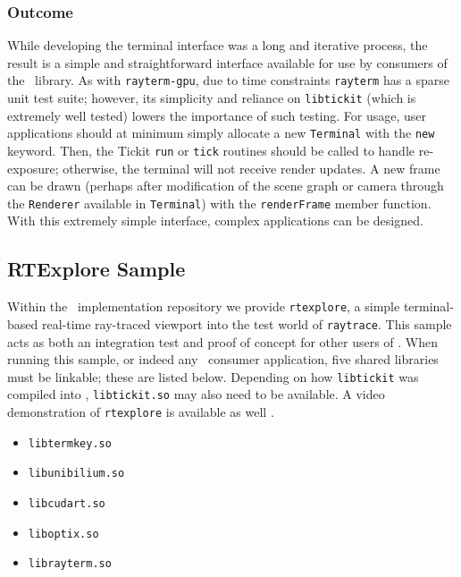 \subsubsection{Outcome} \label{ch:methods:interface:tickit:outcome}

While developing the terminal interface was a long and iterative process, the result is a simple and straightforward interface available for use by consumers of the \name\ library.
As with \texttt{rayterm-gpu}, due to time constraints \texttt{rayterm} has a sparse unit test suite; however, its simplicity and reliance on \texttt{libtickit} (which is extremely well tested) lowers the importance of such testing.
For usage, user applications should at minimum simply allocate a new \texttt{Terminal} with the \texttt{new} keyword.
Then, the Tickit \texttt{run} or \texttt{tick} routines should be called to handle re-exposure; otherwise, the terminal will not receive render updates.
A new frame can be drawn (perhaps after modification of the scene graph or camera through the \texttt{Renderer} available in \texttt{Terminal}) with the \texttt{renderFrame} member function.
With this extremely simple interface, complex applications can be designed.


\subsection{RTExplore Sample} \label{ch:methods:interface:sample}

Within the \name\ implementation repository \cite{raytermGpuImpl} we provide \texttt{rtexplore}, a simple terminal-based real-time ray-traced viewport into the test world of \texttt{raytrace}.
This sample acts as both an integration test and proof of concept for other users of \name.
When running this sample, or indeed any \name\ consumer application, five shared libraries must be linkable; these are listed below.
Depending on how \texttt{libtickit} was compiled into \name, \texttt{libtickit.so} may also need to be available.
A video demonstration of \texttt{rtexplore} is available as well \cite{raytermDemo}.

\vspace{-0.5em}
\begin{itemize}
  \vspace{-0.5em}
  \item \texttt{libtermkey.so}
  \vspace{-0.5em}
  \item \texttt{libunibilium.so}
  \vspace{-0.5em}
  \item \texttt{libcudart.so}
  \vspace{-0.5em}
  \item \texttt{liboptix.so}
  \vspace{-0.5em}
  \item \texttt{librayterm.so}
  \vspace{-0.5em}
\end{itemize}
\vspace{-0.5em}

